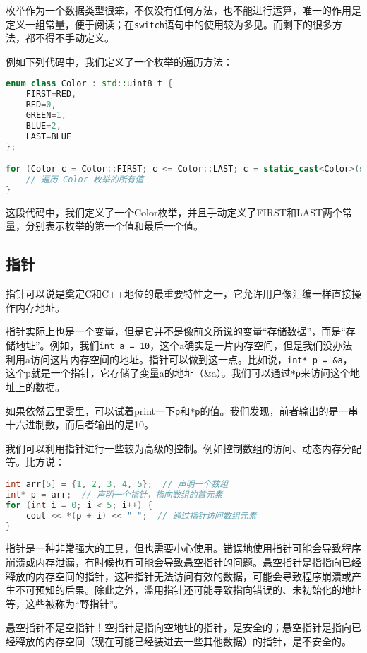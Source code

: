 枚举作为一个数据类型很笨，不仅没有任何方法，也不能进行运算，唯一的作用是定义一组常量，便于阅读；在\texttt{switch}语句中的使用较为多见。而剩下的很多方法，都不得不手动定义。

例如下列代码中，我们定义了一个枚举的遍历方法：
\begin{lstlisting}[language=C++]
enum class Color : std::uint8_t {
    FIRST=RED,
    RED=0,
    GREEN=1,
    BLUE=2,
    LAST=BLUE
};

for (Color c = Color::FIRST; c <= Color::LAST; c = static_cast<Color>(static_cast<int>(c) + 1)) {
    // 遍历 Color 枚举的所有值
}
\end{lstlisting}
这段代码中，我们定义了一个Color枚举，并且手动定义了FIRST和LAST两个常量，分别表示枚举的第一个值和最后一个值。

\subsection{指针}

指针可以说是奠定C和C++地位的最重要特性之一，它允许用户像汇编一样直接操作内存地址。

指针实际上也是一个变量，但是它并不是像前文所说的变量“存储数据”，而是“存储地址”。例如，我们\texttt{int a = 10}，这个a确实是一片内存空间，但是我们没办法利用a访问这片内存空间的地址。指针可以做到这一点。比如说，\texttt{int* p = \&a}，这个p就是一个指针，它存储了变量a的地址（\&a）。我们可以通过\texttt{*p}来访问这个地址上的数据。

如果依然云里雾里，可以试着print一下\texttt{p}和\texttt{*p}的值。我们发现，前者输出的是一串十六进制数，而后者输出的是10。

我们可以利用指针进行一些较为高级的控制。例如控制数组的访问、动态内存分配等。比方说：

\begin{lstlisting}[language=C++]
int arr[5] = {1, 2, 3, 4, 5};  // 声明一个数组
int* p = arr;  // 声明一个指针，指向数组的首元素
for (int i = 0; i < 5; i++) {
    cout << *(p + i) << " ";  // 通过指针访问数组元素
}
\end{lstlisting}

指针是一种非常强大的工具，但也需要小心使用。错误地使用指针可能会导致程序崩溃或内存泄漏，有时候也有可能会导致悬空指针的问题。悬空指针是指指向已经释放的内存空间的指针，这种指针无法访问有效的数据，可能会导致程序崩溃或产生不可预知的后果。除此之外，滥用指针还可能导致指向错误的、未初始化的地址等，这些被称为“野指针”。

\begin{tip}
  悬空指针不是空指针！空指针是指向空地址的指针，是安全的；悬空指针是指向已经释放的内存空间（现在可能已经装进去一些其他数据）的指针，是不安全的。
\end{tip}

